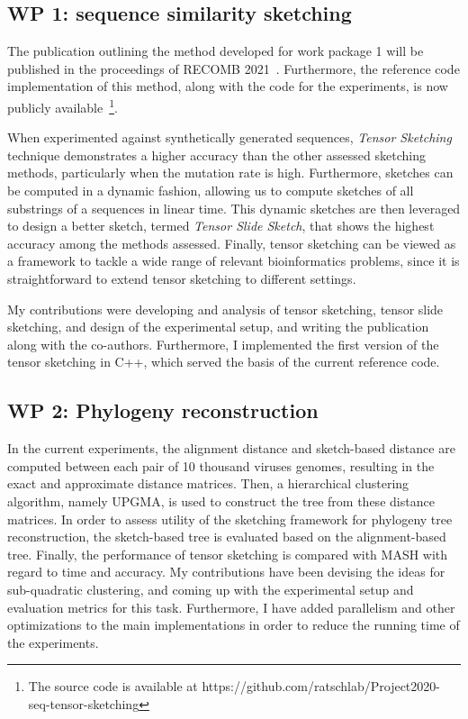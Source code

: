 

\subsection{WP 1: sequence similarity sketching}
The publication outlining the method developed for work package 1 will be published in the proceedings of RECOMB 2021~\cite{joudaki2020fast}. Furthermore, the reference code implementation of this method, along with the code for the experiments, is now publicly available~\footnote{The source code is available at https://github.com/ratschlab/Project2020-seq-tensor-sketching}. 

When experimented against synthetically generated sequences, \emph{Tensor Sketching} technique demonstrates a higher accuracy than the other assessed sketching methods, particularly when the mutation rate is high. Furthermore, sketches can be computed in a dynamic fashion, allowing us to compute sketches of all substrings of a sequences in linear time. This dynamic sketches are then leveraged to design a better sketch, termed \emph{Tensor Slide Sketch}, that shows the highest accuracy among the methods assessed. Finally, tensor sketching can be viewed as a framework to tackle a wide range of relevant bioinformatics problems, since it is straightforward to extend tensor sketching to different settings.

My contributions were developing and analysis of tensor sketching, tensor slide sketching, and design of the experimental setup, and writing the publication along with the co-authors. Furthermore, I implemented the first version of the tensor sketching in C++, which served the basis of the current reference code.


\subsection{WP 2: Phylogeny reconstruction}
In the current experiments, the alignment distance and sketch-based distance are computed between each pair of 10 thousand viruses genomes, resulting in the exact and approximate distance matrices. Then, a hierarchical clustering algorithm, namely UPGMA, is used to construct the tree from these distance matrices. In order to assess utility of the sketching framework for phylogeny tree reconstruction, the sketch-based tree is evaluated based on the alignment-based tree. Finally, the performance of tensor sketching is compared with MASH with regard to time and accuracy. 
My contributions have been devising the ideas for sub-quadratic clustering, and coming up with the experimental setup and evaluation metrics for this task. Furthermore, I have added parallelism and other optimizations to the main implementations in order to reduce the running time of the experiments.
